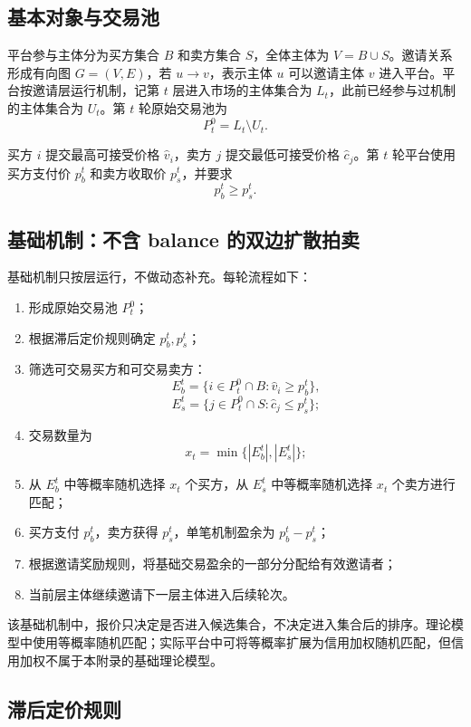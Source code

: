 \documentclass[UTF8,a4paper,12pt]{ctexart}
\begin{document}
\subsection{基本对象与交易池}

平台参与主体分为买方集合 \(B\) 和卖方集合 \(S\)，全体主体为 \(V=B\cup S\)。邀请关系形成有向图 \(G=(V,E)\)，若 \(u\to v\)，表示主体 \(u\) 可以邀请主体 \(v\) 进入平台。平台按邀请层运行机制，记第 \(t\) 层进入市场的主体集合为 \(L_t\)，此前已经参与过机制的主体集合为 \(U_t\)。第 \(t\) 轮原始交易池为
\[
    P_t^0=L_t\setminus U_t.
\]

买方 \(i\) 提交最高可接受价格 \(\hat v_i\)，卖方 \(j\) 提交最低可接受价格 \(\hat c_j\)。第 \(t\) 轮平台使用买方支付价 \(p_b^t\) 和卖方收取价 \(p_s^t\)，并要求
\[
    p_b^t\ge p_s^t.
\]

\subsection{基础机制：不含 balance 的双边扩散拍卖}

基础机制只按层运行，不做动态补充。每轮流程如下：

\begin{enumerate}
    \item 形成原始交易池 \(P_t^0\)；
    \item 根据滞后定价规则确定 \(p_b^t,p_s^t\)；
    \item 筛选可交易买方和可交易卖方：
          \[
              E_b^t=\{i\in P_t^0\cap B:\hat v_i\ge p_b^t\},
          \]
          \[
              E_s^t=\{j\in P_t^0\cap S:\hat c_j\le p_s^t\};
          \]
    \item 交易数量为
          \[
              x_t=\min\{|E_b^t|,|E_s^t|\};
          \]
    \item 从 \(E_b^t\) 中等概率随机选择 \(x_t\) 个买方，从 \(E_s^t\) 中等概率随机选择 \(x_t\) 个卖方进行匹配；
    \item 买方支付 \(p_b^t\)，卖方获得 \(p_s^t\)，单笔机制盈余为 \(p_b^t-p_s^t\)；
    \item 根据邀请奖励规则，将基础交易盈余的一部分分配给有效邀请者；
    \item 当前层主体继续邀请下一层主体进入后续轮次。
\end{enumerate}

该基础机制中，报价只决定是否进入候选集合，不决定进入集合后的排序。理论模型中使用等概率随机匹配；实际平台中可将等概率扩展为信用加权随机匹配，但信用加权不属于本附录的基础理论模型。

\subsection{滞后定价规则}
\end{document}
